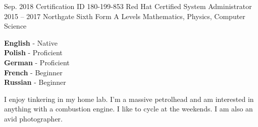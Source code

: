 \documentclass[10pt]{developercv} %
\begin{document}


\begin{entrylist}
	\entry
		{Sep. 2018}
		{Certification ID 180-199-853}
		{Red Hat Certified System Administrator}
    {}
	\entry
		{2015 -- 2017}
		{Northgate Sixth Form}
		{A Levels}
		{Mathematics, Physics, Computer Science}
\end{entrylist}


\begin{minipage}[t]{0.3\textwidth}
	\vspace{-\baselineskip} %

	
	\textbf{English} - Native \\
	\textbf{Polish} - Proficient \\
	\textbf{German} - Proficient \\
  \textbf{French} - Beginner \\
  \textbf{Russian} - Beginner
\end{minipage}
\hfill
\begin{minipage}[t]{0.5\textwidth}
	\vspace{-\baselineskip} %
	
	
	I enjoy tinkering in my home lab. I'm a massive \linebreak petrolhead and am interested in anything with a \linebreak combustion engine. I like to cycle at the weekends. I am also an avid photographer.
\end{minipage}
\hfill
\begin{minipage}[t]{0.5\textwidth}
	\vspace{-\baselineskip} %
\end{minipage}

\end{document}
